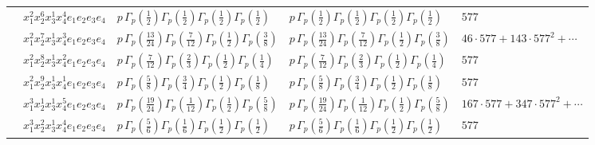 \documentclass[11pt]{article}
\begin{document}
\begin{table}[ht]
{\begin{tabular}{@{}lllll@{}}
 & $x_{1}^{2} x_{2}^{6} x_{3}^{1} x_{4}^{4}  e_{1} e_{2} e_{3} e_{4}$ & $p \, \Gamma_p \left( \frac{1}{2} \right) \Gamma_p \left( \frac{1}{2} \right) \Gamma_p \left( \frac{1}{2} \right) \Gamma_p \left( \frac{1}{2} \right)$ & $p \, \Gamma_p \left( \frac{1}{2} \right) \Gamma_p \left( \frac{1}{2} \right) \Gamma_p \left( \frac{1}{2} \right) \Gamma_p \left( \frac{1}{2} \right)$ & $577$ \\
 & $x_{1}^{2} x_{2}^{7} x_{3}^{1} x_{4}^{3}  e_{1} e_{2} e_{3} e_{4}$ & $p \, \Gamma_p \left( \frac{13}{24} \right) \Gamma_p \left( \frac{7}{12} \right) \Gamma_p \left( \frac{1}{2} \right) \Gamma_p \left( \frac{3}{8} \right)$ & $p \, \Gamma_p \left( \frac{13}{24} \right) \Gamma_p \left( \frac{7}{12} \right) \Gamma_p \left( \frac{1}{2} \right) \Gamma_p \left( \frac{3}{8} \right)$ & $46{\cdot}577{+}143{\cdot}577^{2}{+}\cdots$ \\
 & $x_{1}^{2} x_{2}^{8} x_{3}^{1} x_{4}^{2}  e_{1} e_{2} e_{3} e_{4}$ & $p \, \Gamma_p \left( \frac{7}{12} \right) \Gamma_p \left( \frac{2}{3} \right) \Gamma_p \left( \frac{1}{2} \right) \Gamma_p \left( \frac{1}{4} \right)$ & $p \, \Gamma_p \left( \frac{7}{12} \right) \Gamma_p \left( \frac{2}{3} \right) \Gamma_p \left( \frac{1}{2} \right) \Gamma_p \left( \frac{1}{4} \right)$ & $577$ \\
 & $x_{1}^{2} x_{2}^{9} x_{3}^{1} x_{4}^{1}  e_{1} e_{2} e_{3} e_{4}$ & $p \, \Gamma_p \left( \frac{5}{8} \right) \Gamma_p \left( \frac{3}{4} \right) \Gamma_p \left( \frac{1}{2} \right) \Gamma_p \left( \frac{1}{8} \right)$ & $p \, \Gamma_p \left( \frac{5}{8} \right) \Gamma_p \left( \frac{3}{4} \right) \Gamma_p \left( \frac{1}{2} \right) \Gamma_p \left( \frac{1}{8} \right)$ & $577$ \\
 & $x_{1}^{3} x_{2}^{1} x_{3}^{1} x_{4}^{5}  e_{1} e_{2} e_{3} e_{4}$ & $p \, \Gamma_p \left( \frac{19}{24} \right) \Gamma_p \left( \frac{1}{12} \right) \Gamma_p \left( \frac{1}{2} \right) \Gamma_p \left( \frac{5}{8} \right)$ & $p \, \Gamma_p \left( \frac{19}{24} \right) \Gamma_p \left( \frac{1}{12} \right) \Gamma_p \left( \frac{1}{2} \right) \Gamma_p \left( \frac{5}{8} \right)$ & $167{\cdot}577{+}347{\cdot}577^{2}{+}\cdots$ \\
 & $x_{1}^{3} x_{2}^{2} x_{3}^{1} x_{4}^{4}  e_{1} e_{2} e_{3} e_{4}$ & $p \, \Gamma_p \left( \frac{5}{6} \right) \Gamma_p \left( \frac{1}{6} \right) \Gamma_p \left( \frac{1}{2} \right) \Gamma_p \left( \frac{1}{2} \right)$ & $p \, \Gamma_p \left( \frac{5}{6} \right) \Gamma_p \left( \frac{1}{6} \right) \Gamma_p \left( \frac{1}{2} \right) \Gamma_p \left( \frac{1}{2} \right)$ & $577$ \\

\end{tabular}}
\end{table}
\end{document}
